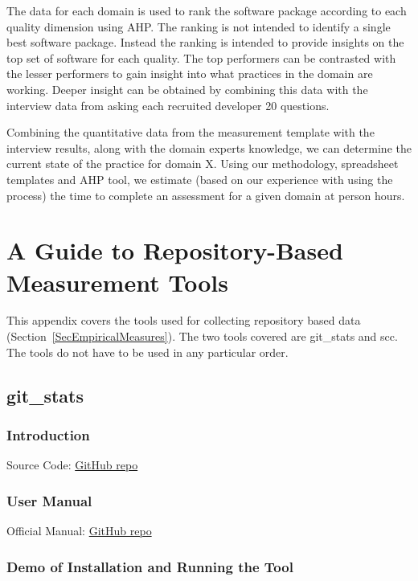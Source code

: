 \documentclass[letterpaper,cleveref]{lipics-v2019}
\newcounter{totHours} %
\begin{document}
The data for each domain is used to rank the software package according to each
quality dimension using AHP.  The ranking is not intended to identify a single
best software package.  Instead the ranking is intended to provide insights on
the top set of software for each quality.  The top performers can be contrasted
with the lesser performers to gain insight into what practices in the domain are
working.  Deeper insight can be obtained by combining this data with the
interview data from asking each recruited developer 20 questions.

Combining the quantitative data from the measurement template with the interview
results, along with the domain experts knowledge, we can determine the current
state of the practice for domain X.  Using our methodology, spreadsheet
templates and AHP tool, we estimate (based on our experience with using the
process) the time to complete an assessment for a given domain at
 person hours.

\newpage

\appendix

\section{A Guide to Repository-Based Measurement Tools} \label{SecRepoTools}

This appendix covers the tools used for collecting repository based data
(Section~\ref{SecEmpiricalMeasures}).  The two tools covered are git\_stats and
scc.  The tools do not have to be used in any particular order.

\subsection{git\_stats}

\subsubsection{Introduction}

Source Code: \href{https://github.com/tomgi/git_stats}{GitHub repo}

\subsubsection{User Manual} \label{git_stats_manual}

Official Manual: \href{https://github.com/tomgi/git_stats}{GitHub repo}

\subsubsection{Demo of Installation and Running the Tool}
\end{document}
